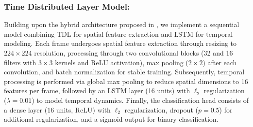 \documentclass[runningheads]{llncs}
\begin{document}
\subsubsection{Time Distributed Layer Model:}
\label{sec:time-distr-layer}
Building upon the hybrid architecture proposed in \cite{Dhage2025}, we
implement a sequential model combining \ac{TDL} for spatial feature
extraction and \ac{LSTM} for temporal modeling. Each frame undergoes
spatial feature extraction through resizing to $224\times224$
resolution, processing through two convolutional blocks (32 and 16
filters with $3\times3$ kernels and ReLU activation), max pooling
($2\times2$) after each convolution, and batch normalization for
stable training. Subsequently, temporal processing is performed via
global max pooling to reduce spatial dimensions to 16 features per
frame, followed by an LSTM layer (16 units) with $\ell_2$
regularization ($\lambda=0.01$) to model temporal dynamics. Finally,
the classification head consists of a dense layer (16 units, ReLU)
with $\ell_2$ regularization, dropout ($p=0.5$) for additional
regularization, and a sigmoid output for binary classification.



    
\end{document}
